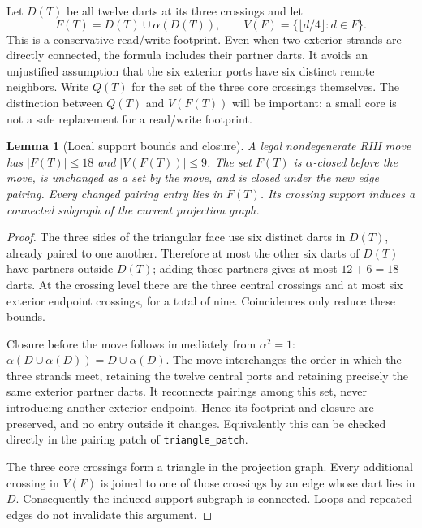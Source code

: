 \documentclass[11pt]{article}
\newtheorem{lemma}[theorem]{Lemma}
\theoremstyle{definition}
\newcommand{\code}[1]{\texttt{#1}}
\begin{document}
Let $D(T)$ be all twelve darts at its three crossings and let
\begin{equation}
 F(T)=D(T)\cup\alpha(D(T)),\qquad
 V(F)=\{\lfloor d/4\rfloor:d\in F\}.
 \label{eq:footprint}
\end{equation}
This is a conservative read/write footprint. Even when two exterior
strands are directly connected, the formula includes their partner darts.
It avoids an unjustified assumption that the six exterior ports have
six distinct remote neighbors. Write $Q(T)$ for the set of the three core
crossings themselves. The distinction between $Q(T)$ and $V(F(T))$ will
be important: a small core is not a safe replacement for a read/write
footprint.

\begin{lemma}[Local support bounds and closure]
\label{lem:18}
A legal nondegenerate RIII move has $|F(T)|\le18$ and $|V(F(T))|\le9$.
The set $F(T)$ is $\alpha$-closed before the move, is unchanged as a set
by the move, and is closed under the new edge pairing. Every changed
pairing entry lies in $F(T)$. Its crossing support induces a connected
subgraph of the current projection graph.
\end{lemma}

\begin{proof}
The three sides of the triangular face use six distinct darts in $D(T)$,
already paired to one another. Therefore at most the other six darts of
$D(T)$ have partners outside $D(T)$; adding those partners gives at most
$12+6=18$ darts. At the crossing level there are the three central
crossings and at most six exterior endpoint crossings, for a total of
nine. Coincidences only reduce these bounds.

Closure before the move follows immediately from $\alpha^2=1$:
$\alpha(D\cup\alpha(D))=D\cup\alpha(D)$. The move interchanges the
order in which the three strands meet, retaining the twelve central
ports and retaining precisely the same exterior partner darts. It
reconnects pairings among this set, never introducing another exterior
endpoint. Hence its footprint and closure are preserved, and no entry
outside it changes. Equivalently this can be checked directly in the
pairing patch of \code{triangle\_patch}.

The three core crossings form a triangle in the projection graph.
Every additional crossing in $V(F)$ is joined to one of those crossings
by an edge whose dart lies in $D$. Consequently the induced support
subgraph is connected. Loops and repeated edges do not invalidate this
argument.
\end{proof}
\end{document}
